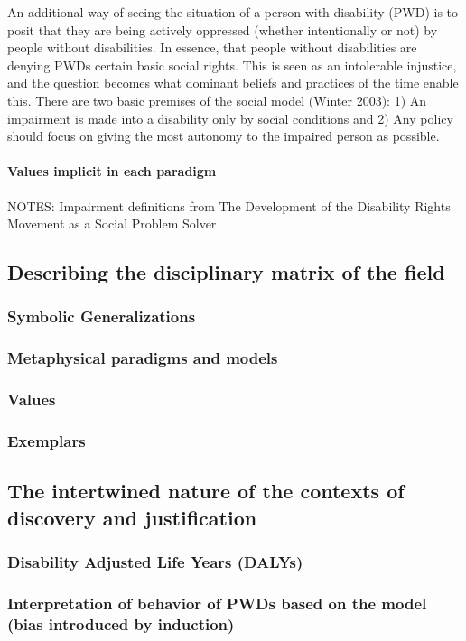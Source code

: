 \documentclass{lps}
\begin{document}
An additional way of seeing the situation of a person with disability (PWD) is to posit that they are being actively oppressed (whether intentionally or not) by people without disabilities. In essence, that people without disabilities are denying PWDs certain basic social rights. This is seen as an intolerable injustice, and the question becomes what dominant beliefs and practices of the time enable this. There are two basic premises of the social model (Winter 2003): 1) An impairment is made into a disability only by social conditions and 2) Any policy should focus on giving the most autonomy to the impaired person as possible.
\paragraph{Values implicit in each paradigm}


NOTES:
Impairment definitions from The Development of the Disability Rights Movement as a Social Problem Solver 

\subsection{Describing the disciplinary matrix of the field}
\subsubsection{Symbolic Generalizations}
\subsubsection{Metaphysical paradigms and models}
\subsubsection{Values}
\subsubsection{Exemplars}
\subsection{The intertwined nature of the contexts of discovery and
justification}
\subsubsection{Disability Adjusted Life Years (DALYs)}
\subsubsection{Interpretation of behavior of PWDs based on the model (bias
introduced by induction)}
\end{document}
